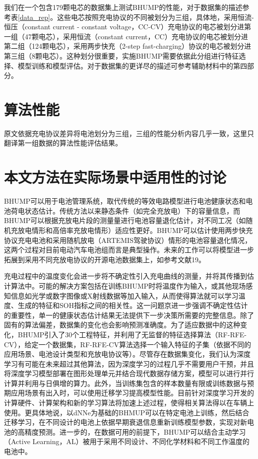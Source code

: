 \documentclass{article}
\begin{document}
我们在一个包含179颗电芯的数据集上测试BHUMP的性能，对于数据集的描述参考表\ref{data_rep}。这些电芯按照充电协议的不同被划分为三组，具体地，采用恒流-恒压（constant current - constant voltage，CC-CV）充电协议的电芯被划分进第一组（47颗电芯），采用恒流（constant current，CC）充电协议的电芯被划分进第二组（124颗电芯），采用两步快充（2-step fast-charging）协议的电芯被划分进第三组（8颗电芯）。这种划分很重要，实施BHUMP需要依据此分组进行特征选择、模型训练和模型评估。对于数据集的更详尽的描述可参考辅助材料中的第四部分。

\section{算法性能}

原文依据充电协议差异将电池划分为三组，三组的性能分析内容几乎一致，这里只翻译第一组数据的算法性能评估结果。



\section{本文方法在实际场景中适用性的讨论}

BHUMP可以用于电池管理系统，取代传统的等效电路模型进行电池健康状态和电池荷电状态估计。传统方法以来静态条件（如完全充放电）下的容量信息，而BHUMP可以根据充放电片段的测量量进行电池容量退化估计，对不同工况（如随机充放电情形和高倍率充放电情形）适应性更好。BHUMP可以估计使用两步快充协议充电电池和采用随机放电（ARTEMIS驾驶协议）情形的电池容量退化情况，这两个过程对目前电动汽车电池组而言是典型操作。未来的工作可以将模型进一步拓展到采用不同充放电协议的开源电池数据集上，如参考文献19。

充电过程中的温度变化会进一步将不确定性引入充电曲线的测量，并将其传播到估计算法中。可能的解决方案包括在训练BHUMP时将温度作为输入，或其他现场感知信息如光学或数字图像或X射线数据等加入输入，从而使得算法就可以学习温度、生成的特征和SOH指标之间的相关性。这一问题京进一步强调不确定性估计的重要性，单一的健康状态估计结果无法提供下一步决策所需要的完整信息。除了固有的算法偏差，数据集的变化也会影响预测准确度。为了适应数据中的这种变化，BHUMP引入了30个工程特征，并利用了无监督的特征选择算法（RF-RFE-CV），给定一个数据集，RF-RFE-CV算法选择一个输入特征的子集（依据不同的应用场景、电池设计类型和充放电协议等）。尽管存在数据集变化，我们认为深度学习有可能在未来超过其他算法，因为深度学习的过程几乎不需要用户干预，并且将深度学习模型部署在图形处理单元并结合现代数据存储方案，模型可以进行并行计算并利用与日俱增的算力。此外，当训练集包含的样本数量有限或训练数据与预期应用场景有出入时，可以使用迁移学习提高模型性能。目前针对深度学习开发的计算硬件、计算架构和新的学习算法将加速上述过程，使得相关算法得以在车辆上使用。更具体地说，以dNNe为基础的BHMUP可以在特定电池上训练，然后结合迁移学习，在不同设计的电池上依据早期衰退信息重新训练模型参数，实现对新电池的高精度预测。进一步的，在数据可用的前提下，BHUMP可以结合主动学习（Active Learning，AL）被用于采用不同设计、不同化学材料和不同工作温度的电池中。
\end{document}
